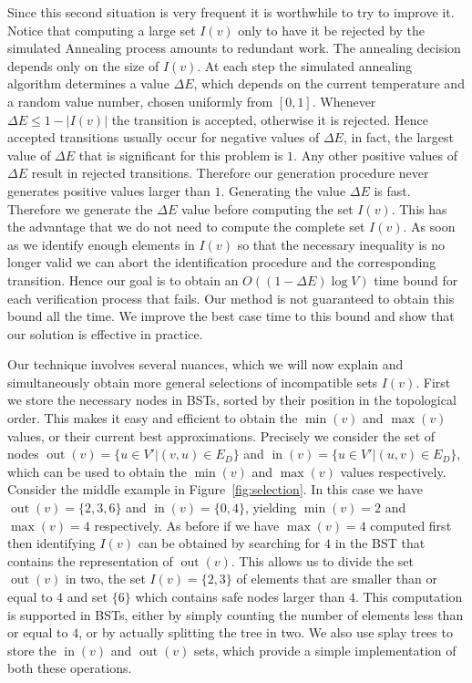 \documentclass[a4paper]{article}
\DeclareMathOperator{\inn}{in}
\DeclareMathOperator{\out}{out}
\begin{document}
Since this second situation is very frequent it is worthwhile to try to
improve it. Notice that computing a large set $I(v)$ only to have it be
rejected by the simulated Annealing process amounts to redundant work. The
annealing decision depends only on the size of $I(v)$. At each step the
simulated annealing algorithm determines a value $\Delta E$, which depends
on the current temperature and a random value number, chosen uniformly from
$[0,1]$. Whenever $\Delta E \leq 1 - |I(v)|$ the transition is accepted,
otherwise it is rejected. Hence accepted transitions usually occur for
negative values of $\Delta E$, in fact, the largest value of $\Delta E$ that
is significant for this problem is $1$. Any other positive values of
$\Delta E$ result in rejected transitions. Therefore our generation
procedure never generates positive values larger than $1$. Generating the
value $\Delta E$ is fast. Therefore we generate the $\Delta E$ value before
computing the set $I(v)$. This has the advantage that we do not need to
compute the complete set $I(v)$. As soon as we identify enough elements in
$I(v)$ so that the necessary inequality is no longer valid we can abort the
identification procedure and the corresponding transition. Hence our goal
is to obtain an $O((1 - \Delta E) \log V)$ time bound for each verification
process that fails. Our method is not guaranteed to obtain this bound all
the time. We improve the best case time to this bound and show that our
solution is effective in practice.

Our technique involves several nuances, which we will now explain and
simultaneously obtain more general selections of incompatible sets
$I(v)$. First we store the necessary nodes in BSTs, sorted by their
position in the topological order. This makes it easy and efficient to
obtain the $\min(v)$ and $\max(v)$ values, or their current best
approximations. Precisely we consider the set of nodes
$\out(v) = \{ u \in V' | (v, u) \in E_D\}$ and
$\inn(v) = \{ u \in V' | (u, v) \in E_D\}$, which can be used to obtain the
$\min(v)$ and $\max(v)$ values respectively. Consider the middle example in
Figure~\ref{fig:selection}. In this case we have $\out(v) = \{2, 3, 6\}$
and $\inn(v) = \{ 0, 4\}$, yielding $\min(v) = 2$ and $\max(v) = 4$
respectively. As before if we have $\max(v) = 4$ computed first then
identifying $I(v)$ can be obtained by searching for $4$ in the BST that
contains the representation of $\out(v)$. This allows us to divide the set
$\out(v)$ in two, the set $I(v) = \{ 2, 3 \}$ of elements that are smaller
than or equal to $4$ and set $\{6 \}$ which contains safe nodes larger than
$4$. This computation is supported in BSTs, either by simply counting the
number of elements less than or equal to $4$, or by actually splitting the
tree in two. We also use splay trees to store the $\inn(v)$ and $\out(v)$
sets, which provide a simple implementation of both these operations.
\end{document}
